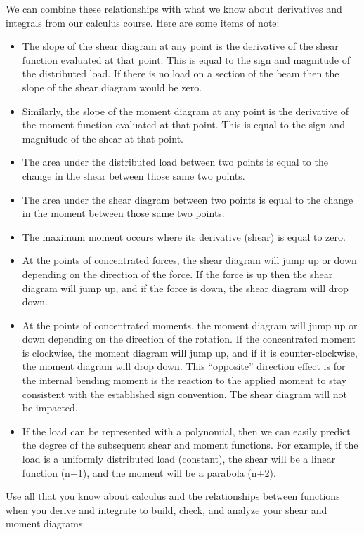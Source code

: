 \documentclass[
  letterpaper,
  DIV=11,
  numbers=noendperiod]{scrreprt}
\theoremstyle{definition}
\theoremstyle{remark}
\begin{document}
We can combine these relationships with what we know about derivatives
and integrals from our calculus course. Here are some items of note:

\begin{itemize}
\item
  The slope of the shear diagram at any point is the derivative of the
  shear function evaluated at that point. This is equal to the sign and
  magnitude of the distributed load. If there is no load on a section of
  the beam then the slope of the shear diagram would be zero.
\item
  Similarly, the slope of the moment diagram at any point is the
  derivative of the moment function evaluated at that point. This is
  equal to the sign and magnitude of the shear at that point.
\item
  The area under the distributed load between two points is equal to the
  change in the shear between those same two points.
\item
  The area under the shear diagram between two points is equal to the
  change in the moment between those same two points.
\item
  The maximum moment occurs where its derivative (shear) is equal to
  zero.
\item
  At the points of concentrated forces, the shear diagram will jump up
  or down depending on the direction of the force. If the force is up
  then the shear diagram will jump up, and if the force is down, the
  shear diagram will drop down.
\item
  At the points of concentrated moments, the moment diagram will jump up
  or down depending on the direction of the rotation. If the
  concentrated moment is clockwise, the moment diagram will jump up, and
  if it is counter-clockwise, the moment diagram will drop down. This
  ``opposite'' direction effect is for the internal bending moment is
  the reaction to the applied moment to stay consistent with the
  established sign convention. The shear diagram will not be impacted.
\item
  If the load can be represented with a polynomial, then we can easily
  predict the degree of the subsequent shear and moment functions. For
  example, if the load is a uniformly distributed load (constant), the
  shear will be a linear function (n+1), and the moment will be a
  parabola (n+2).
\end{itemize}

Use all that you know about calculus and the relationships between
functions when you derive and integrate to build, check, and analyze
your shear and moment diagrams.
\end{document}
